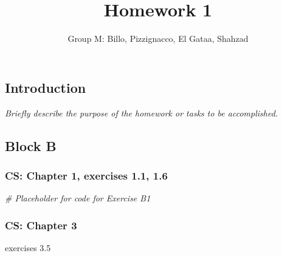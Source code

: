 \documentclass[
]{article}
\title{Homework 1}
\author{Group M: Billo, Pizzignacco, El Gataa, Shahzad}
\date{}
\newenvironment{Shaded}{\begin{snugshade}}{\end{snugshade}}
\newcommand{\CommentTok}[1]{\textcolor[rgb]{0.56,0.35,0.01}{\textit{#1}}}
\begin{document}
\maketitle

\hypertarget{introduction}{%
\subsection{Introduction}\label{introduction}}

\emph{Briefly describe the purpose of the homework or tasks to be
accomplished.}

\hypertarget{block-b}{%
\subsection{Block B}\label{block-b}}

\hypertarget{cs-chapter-1-exercises-1.1-1.6}{%
\subsubsection{CS: Chapter 1, exercises 1.1,
1.6}\label{cs-chapter-1-exercises-1.1-1.6}}

\begin{Shaded}
\begin{Highlighting}[]
\CommentTok{\# Placeholder for code for Exercise B1}
\end{Highlighting}
\end{Shaded}

\hypertarget{cs-chapter-3}{%
\subsubsection{CS: Chapter 3}\label{cs-chapter-3}}

exercises 3.5
\end{document}
